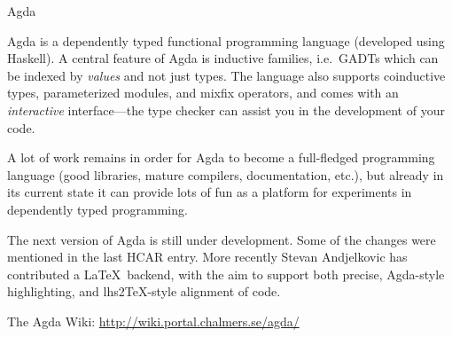 \documentclass{article}
\begin{document}
\begin{hcarentry}{Agda}
\label{agda}
\makeheader

Agda is a dependently typed functional programming language (developed
using Haskell). A central feature of Agda is inductive families,
i.e.\ GADTs which can be indexed by \emph{values} and not just types.
The language also supports coinductive types, parameterized modules,
and mixfix operators, and comes with an \emph{interactive}
interface---the type checker can assist you in the development of your
code.

A lot of work remains in order for Agda to become a full-fledged
programming language (good libraries, mature compilers, documentation,
etc.), but already in its current state it can provide lots of fun as
a platform for experiments in dependently typed programming.

The next version of Agda is still under development. Some of the
changes were mentioned in the last HCAR entry. More recently Stevan
Andjelkovic has contributed a \LaTeX\ backend, with the aim to support
both precise, Agda-style highlighting, and lhs2TeX-style alignment of
code.

\FurtherReading
  The Agda Wiki: \url{http://wiki.portal.chalmers.se/agda/}
\end{hcarentry}
\end{document}
